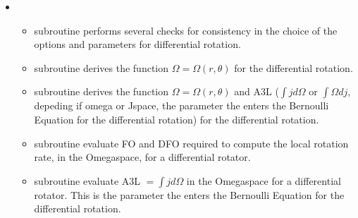 \documentclass[letterpaper,10pt,english]{sphinxmanual}
\begin{document}
\begin{itemize}
\begin{itemize}
\item {} 
\sphinxAtStartPar
subroutine  \sphinxhyphen{} solves the equations \(\Phi _\mathrm{a} \big |_{S _\mathrm{NS}} = \Sigma _l Y(\theta) (a_l r^l) |_{S _\mathrm{NS}}\) (inside the star) and \(\Phi _\mathrm{a} \big |_{S _\mathrm{NS}} = \Sigma _l Y(\theta) (b_l r^{-(l+1)}) |_{S _\mathrm{NS}}\) (outside the star), where \(S _\mathrm{NS}\) is stellar surface and \(\Phi _\mathrm{a} \big |_{S _\mathrm{NS}} = (\Phi + \Omega \Psi + C) |_{S _\mathrm{NS}}\). Each system of equations is solved with a LU decomposition and a subsequent backward substitution adopting the routines provided in the Numerical Recipes (ludcmp and
lubksb). Notice that, in order to avoid spurious effects, the surface terms are evaluated on top
of the super\sphinxhyphen{}ellipsoid that best fit the numerical surface.


\end{itemize}

\item {} 
\sphinxAtStartPar
{}
\begin{itemize}
\item {} 
\sphinxAtStartPar
subroutine  \sphinxhyphen{} performs several checks for consistency in the choice of the options and parameters for differential rotation.

\item {} 
\sphinxAtStartPar
subroutine  \sphinxhyphen{} derives the function \(\Omega = \Omega (r,\theta)\) for the differential rotation.

\item {} 
\sphinxAtStartPar
subroutine  \sphinxhyphen{} derives the function \(\Omega = \Omega (r,\theta)\) and A3L (\(\int jd\Omega\) or \(\int \Omega dj\), depeding if omega or J\sphinxhyphen{}space, the parameter the enters the Bernoulli Equation for the differential rotation) for the differential rotation.

\item {} 
\sphinxAtStartPar
subroutine  \sphinxhyphen{} evaluate FO and DFO required to compute the local rotation rate, in the Omega\sphinxhyphen{}space, for a differential rotator.

\item {} 
\sphinxAtStartPar
subroutine  \sphinxhyphen{} evaluate A3L \(=\int jd\Omega\)  in the Omega\sphinxhyphen{}space for a differential rotator. This is the parameter the enters the Bernoulli Equation for the differential rotation.


\end{itemize}
\end{itemize}
\end{document}

